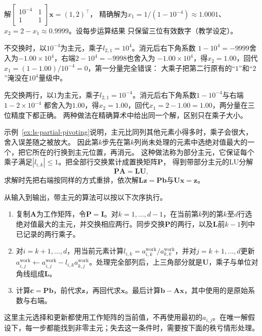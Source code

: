 \begin{example}[小主元与行交换]
\label{ex:ls-partial-pivoting}
解$\left[\begin{smallmatrix}10^{-4}&1\\1&1\end{smallmatrix}\right]\bm x=(1,2)^\top$，
精确解为$x_1=1/(1-10^{-4})\approx1.0001$、$x_2=2-x_1\approx0.9999$。设每步运算结果
只保留三位有效数字（教学设定）。

不交换时，以$10^{-4}$为主元，乘子$l_{2,1}=10^4$。消元后右下角系数
$1-10^4=-9999$舍入为$-1.00\times10^4$，右端$2-10^4=-9998$也舍入为
$-1.00\times10^4$，得$x_2=1.00$，回代$x_1=(1-1.00)/10^{-4}=0$，第一分量完全错误：
大乘子把第二行原有的“$1$”和“$2$”淹没在$10^4$量级中。

先交换两行，以$1$为主元，乘子$l_{2,1}=10^{-4}$。消元后右下角系数$1-10^{-4}$与右端$1-2\times10^{-4}$
都舍入为$1.00$，得$x_2=1.00$，回代$x_1=2-1.00=1.00$，两分量在三位精度下都正确。
两种做法在精确算术中给出同一个解，区别只在乘子大小。
\end{example}

示例~\ref{ex:ls-partial-pivoting}说明，主元比同列其他元素小得多时，乘子会很大，舍入误差随之被放大。
因此第$k$步先在第$k$列尚未处理的元素中选绝对值最大的一个，把它所在的行换到主元位置，再消元。
这种做法称为部分主元，它保证每个乘子满足$|l_{i,k}|\leq1$。把全部行交换累计成置换矩阵$\bm P$，
得到带部分主元的LU分解
\begin{equation}
 \bm P\bm A=\bm L\bm U,
 \label{eq:matrix-analysis-palu}
\end{equation}
求解时先把右端按同样的方式重排，依次解$\bm L\bm z=\bm P\bm b$与$\bm U\bm x=\bm z$。

从输入到输出，带主元的算法可以按以下次序执行。
\begin{enumerate}
 \item 复制$\bm A$为工作矩阵，令$\bm P=\bm I$。对$k=1,\ldots,d-1$，在当前第$k$列的第$k$至$d$行选绝对值最大的主元，并交换相应两行。同步交换$\bm P$的两行，以及$\bm L$前$k-1$列中已记录的两行乘子。
 \item 对$i=k+1,\ldots,d$，用当前元素计算$l_{i,k}=a_{i,k}^{\mathrm{work}}/a_{k,k}^{\mathrm{work}}$，并对$j=k+1,\ldots,d$更新$a_{i,j}^{\mathrm{work}}\leftarrow a_{i,j}^{\mathrm{work}}-l_{i,k}a_{k,j}^{\mathrm{work}}$。处理完全部列后，上三角部分就是$\bm U$，乘子与单位对角线组成$\bm L$。
 \item 计算$\bm c=\bm P\bm b$，前代求$\bm z$，再回代求$\bm x$。最后计算$\bm b-\bm A\bm x$，其中使用的是原始系数与右端。
\end{enumerate}
这里主元选择和更新都使用工作矩阵的当前值，不再使用最初的$a_{i,j}$。在唯一解假设下，每一步都能找到非零主元；失去这一条件时，需要按下面的秩亏情形处理。

